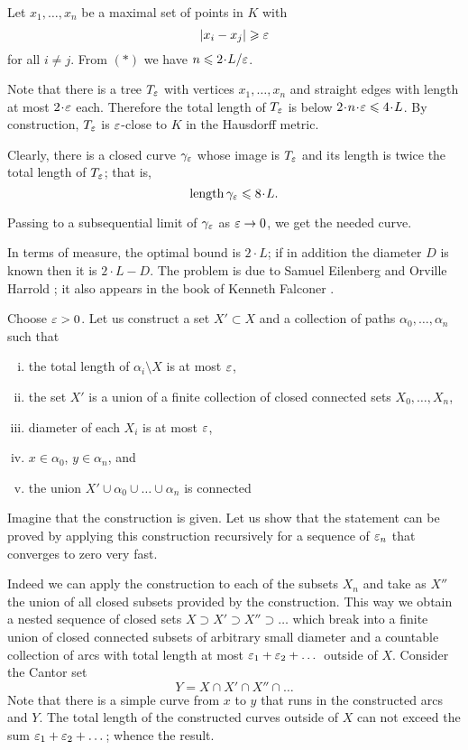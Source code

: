 Let $x_1,\dots, x_n$ be a maximal set of points in $K$ with 
\[|x_i-x_j|\z\ge\eps\] for all $i\ne j$. 
From $(*)$ we have $n\le2\cdot L/\eps$.

Note that there is a tree $T_\varepsilon$ with vertices $x_1,\dots, x_n$ and straight edges with length at most $2\cdot\eps$ each.
Therefore the total length of $T_\varepsilon$ is below $2\cdot n\cdot\eps\le 4\cdot L$.
By construction, 
$T_\varepsilon$ is $\varepsilon$-close to $K$ in the Hausdorff metric.

Clearly, there is a closed curve $\gamma_\varepsilon$ whose image is $T_\varepsilon$ and its length is twice the total length of $T_\varepsilon$;
that is, 
\[\length\gamma_\eps\le 8\cdot L.\]

Passing to a subsequential limit of $\gamma_\varepsilon$ as $\varepsilon\to 0$,
we get the needed curve. \qeds

In terms of measure, the optimal bound is $2\cdot L$;
if in addition the diameter $D$ is known then it is $2\cdot L-D$.
The problem is due to 
Samuel Eilenberg 
and Orville Harrold 
\cite{eilenberg-harrold};
it also appears in the book of Kenneth Falconer \cite[see Exercise 3.5 in][]{falconer}.


Choose $\varepsilon>0$.
Let us construct a set $X'\subset X$ 
 and a collection of paths $\alpha_0,\dots,\alpha_n$ such that 
\begin{enumerate}[(i)]
\item the total length of $\alpha_i\setminus X$ is at most $\varepsilon$,
\item the set $X'$ is a union of a finite collection of closed connected sets $X_0,\dots,X_n$,
\item diameter of each $X_i$ is at most $\varepsilon$,
\item $x\in\alpha_0$, $y\in\alpha_n$, and
\item the union $X'\cup \alpha_0\cup\dots\cup\alpha_n$ is connected
\end{enumerate}

Imagine that the construction is given.
Let us show that the statement can be proved by applying this construction recursively for a sequence of $\varepsilon_n$ that converges to zero very fast.

Indeed we can apply the construction to each of the subsets $X_n$ and take as $X''$ the union of all closed subsets provided by the construction.
This way we obtain a nested sequence of closed sets $X\supset X'\supset X''\supset\dots$ which break into a finite union of closed connected subsets of arbitrary small diameter and a countable collection of arcs with total length at most $\varepsilon_1+\varepsilon_2+\dots$ 
outside of $X$.
Consider the Cantor set 
\[Y= X\cap  X'\cap X''\cap\dots\]
Note that there is a simple curve from $x$ to $y$ that runs in the constructed arcs and $Y$.
The total length of the constructed curves outside of $X$ can not exceed the sum
$\varepsilon_1+\varepsilon_2+\dots$;
whence the result.

